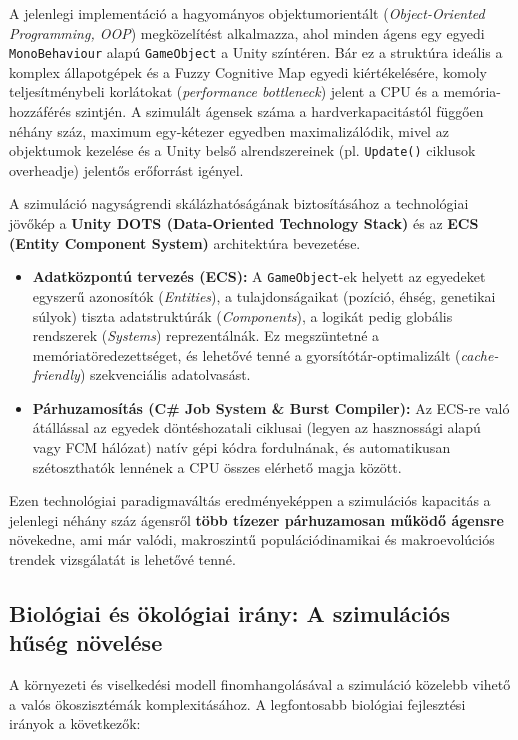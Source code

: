 A jelenlegi implementáció a hagyományos objektumorientált (\textit{Object-Oriented Programming, OOP}) megközelítést alkalmazza, ahol minden ágens egy egyedi \texttt{MonoBehaviour} alapú \texttt{GameObject} a Unity színtéren. Bár ez a struktúra ideális a komplex állapotgépek és a Fuzzy Cognitive Map egyedi kiértékelésére, komoly teljesítménybeli korlátokat (\textit{performance bottleneck}) jelent a CPU és a memória-hozzáférés szintjén. A szimulált ágensek száma a hardverkapacitástól függően néhány száz, maximum egy-kétezer egyedben maximalizálódik, mivel az objektumok kezelése és a Unity belső alrendszereinek (pl. \texttt{Update()} ciklusok overheadje) jelentős erőforrást igényel.

A szimuláció nagyságrendi skálázhatóságának biztosításához a technológiai jövőkép a \textbf{Unity DOTS (Data-Oriented Technology Stack)} és az \textbf{ECS (Entity Component System)} architektúra bevezetése.

\begin{itemize}
    \item \textbf{Adatközpontú tervezés (ECS):} A \texttt{GameObject}-ek helyett az egyedeket egyszerű azonosítók (\textit{Entities}), a tulajdonságaikat (pozíció, éhség, genetikai súlyok) tiszta adatstruktúrák (\textit{Components}), a logikát pedig globális rendszerek (\textit{Systems}) reprezentálnák. Ez megszüntetné a memóriatöredezettséget, és lehetővé tenné a gyorsítótár-optimalizált (\textit{cache-friendly}) szekvenciális adatolvasást.
    \item \textbf{Párhuzamosítás (C\# Job System \& Burst Compiler):} Az ECS-re való átállással az egyedek döntéshozatali ciklusai (legyen az hasznossági alapú vagy FCM hálózat) natív gépi kódra fordulnának, és automatikusan szétoszthatók lennének a CPU összes elérhető magja között.
\end{itemize}

Ezen technológiai paradigmaváltás eredményeképpen a szimulációs kapacitás a jelenlegi néhány száz ágensről \textbf{több tízezer párhuzamosan működő ágensre} növekedne, ami már valódi, makroszintű populációdinamikai és makroevolúciós trendek vizsgálatát is lehetővé tenné.

\subsection{Biológiai és ökológiai irány: A szimulációs hűség növelése}

A környezeti és viselkedési modell finomhangolásával a szimuláció közelebb vihető a valós ökoszisztémák komplexitásához. A legfontosabb biológiai fejlesztési irányok a következők:

